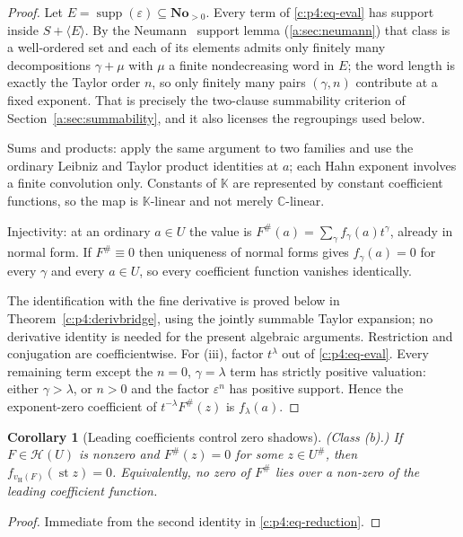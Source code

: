 \documentclass[11pt,a4paper]{article}
\numberwithin{equation}{section}
\newtheorem{corollary}[theorem]{Corollary}
\theoremstyle{definition}
\theoremstyle{remark}
\theoremstyle{plain}
\newcommand{\K}{\mathbb K}
\newcommand{\No}{\mathbf{No}}
\newcommand{\CC}{\mathbb C}
\DeclareMathOperator{\supp}{supp}
\DeclareMathOperator{\st}{st}
\newcommand{\tm}{t}
\newcommand{\halo}[1]{#1^{\#}}
\newcommand{\ev}[1]{#1^{\#}}
\newcommand{\Hc}{\mathcal H}
\newcommand{\vH}{v_{\mathrm H}}
\newcommand{\Neu}[1]{\langle #1\rangle}
\begin{document}
\begin{proof}
Let $E=\supp(\varepsilon)\subseteq\No_{>0}$. Every term of
\eqref{c:p4:eq-eval} has support inside $S+\Neu E$. By the Neumann~\cite{Neumann}
support lemma (\ref{a:sec:neumann}) that class is a well-ordered set and
each of its elements admits only finitely many decompositions
$\gamma+\mu$ with $\mu$ a finite nondecreasing word in $E$; the word
length is exactly the Taylor order $n$, so only finitely many pairs
$(\gamma,n)$ contribute at a fixed exponent. That is precisely the
two-clause summability criterion of Section~\ref{a:sec:summability}, and it also
licenses the regroupings used below.

Sums and products: apply the same argument to two families and use the
ordinary Leibniz and Taylor product identities at $a$; each Hahn
exponent involves a finite convolution only. Constants of $\K$ are
represented by constant coefficient functions, so the map is $\K$-linear
and not merely $\CC$-linear.

Injectivity: at an ordinary $a\in U$ the value is
$\ev F(a)=\sum_\gamma f_\gamma(a)\tm^\gamma$, already in normal form.
If $\ev F\equiv0$ then uniqueness of normal forms gives $f_\gamma(a)=0$
for every $\gamma$ and every $a\in U$, so every coefficient function
vanishes identically.

The identification with the fine derivative is proved below in
Theorem~\ref{c:p4:derivbridge}, using the jointly summable Taylor
expansion; no derivative identity is needed for the present algebraic
arguments. Restriction and conjugation are coefficientwise. For (iii), factor $\tm^{\lambda}$ out of
\eqref{c:p4:eq-eval}. Every remaining term except the $n=0$, $\gamma=
\lambda$ term has strictly positive valuation: either $\gamma>\lambda$,
or $n>0$ and the factor $\varepsilon^n$ has positive support. Hence the
exponent-zero coefficient of $\tm^{-\lambda}\ev F(z)$ is $f_\lambda(a)$.
\end{proof}

\begin{corollary}[Leading coefficients control zero shadows]
\label{c:p4:shadow}
\emph{(Class (b).)} If $F\in\Hc(U)$ is nonzero and $\ev F(z)=0$ for some
$z\in\halo U$, then $f_{\vH(F)}(\st z)=0$. Equivalently, no zero of
$\ev F$ lies over a non-zero of the leading coefficient function.
\end{corollary}

\begin{proof}
Immediate from the second identity in \eqref{c:p4:eq-reduction}.
\end{proof}
\end{document}
